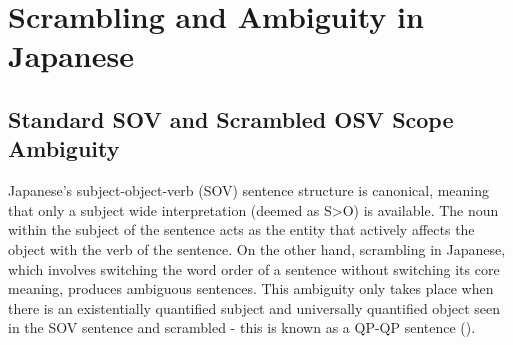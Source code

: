 \documentclass[english, 11pt]{article}
\begin{document}
\section{Scrambling and Ambiguity in Japanese}
\subsection{Standard SOV and Scrambled OSV Scope Ambiguity}
Japanese's subject-object-verb (SOV) sentence structure is canonical, meaning that only a subject wide interpretation (deemed as S>O) is available. The noun within the subject of the sentence acts as the entity that actively affects the object with the verb of the sentence. On the other hand, scrambling in Japanese, which involves switching the word order of a sentence without switching its core meaning, produces ambiguous sentences. This ambiguity only takes place when there is an existentially quantified subject and universally quantified object seen in the SOV sentence and scrambled - this is known as a QP-QP sentence (\cite{s1}).

\end{document}
